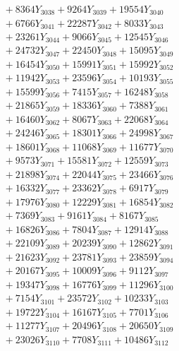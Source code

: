 \documentclass[a4paper,10pt]{article}
\begin{document}
{\begin{align}
&\;  + 8364 Y_{3038} + 9264 Y_{3039} + 19554 Y_{3040} \\[0.3ex]
&\;  + 6766 Y_{3041} + 22287 Y_{3042} + 8033 Y_{3043} \\[0.3ex]
&\;  + 23261 Y_{3044} + 9066 Y_{3045} + 12545 Y_{3046} \\[0.3ex]
&\;  + 24732 Y_{3047} + 22450 Y_{3048} + 15095 Y_{3049} \\[0.3ex]
&\;  + 16454 Y_{3050} + 15991 Y_{3051} + 15992 Y_{3052} \\[0.3ex]
&\;  + 11942 Y_{3053} + 23596 Y_{3054} + 10193 Y_{3055} \\[0.3ex]
&\;  + 15599 Y_{3056} + 7415 Y_{3057} + 16248 Y_{3058} \\[0.5ex]\allowbreak
&\;  + 21865 Y_{3059} + 18336 Y_{3060} + 7388 Y_{3061} \\[0.3ex]
&\;  + 16460 Y_{3062} + 8067 Y_{3063} + 22068 Y_{3064} \\[0.3ex]
&\;  + 24246 Y_{3065} + 18301 Y_{3066} + 24998 Y_{3067} \\[0.3ex]
&\;  + 18601 Y_{3068} + 11068 Y_{3069} + 11677 Y_{3070} \\[0.3ex]
&\;  + 9573 Y_{3071} + 15581 Y_{3072} + 12559 Y_{3073} \\[0.3ex]
&\;  + 21898 Y_{3074} + 22044 Y_{3075} + 23466 Y_{3076} \\[0.3ex]
&\;  + 16332 Y_{3077} + 23362 Y_{3078} + 6917 Y_{3079} \\[0.3ex]
&\;  + 17976 Y_{3080} + 12229 Y_{3081} + 16854 Y_{3082} \\[0.3ex]
&\;  + 7369 Y_{3083} + 9161 Y_{3084} + 8167 Y_{3085} \\[0.3ex]
&\;  + 16826 Y_{3086} + 7804 Y_{3087} + 12914 Y_{3088} \\[0.5ex]\allowbreak
&\;  + 22109 Y_{3089} + 20239 Y_{3090} + 12862 Y_{3091} \\[0.3ex]
&\;  + 21623 Y_{3092} + 23781 Y_{3093} + 23859 Y_{3094} \\[0.3ex]
&\;  + 20167 Y_{3095} + 10009 Y_{3096} + 9112 Y_{3097} \\[0.3ex]
&\;  + 19347 Y_{3098} + 16776 Y_{3099} + 11296 Y_{3100} \\[0.3ex]
&\;  + 7154 Y_{3101} + 23572 Y_{3102} + 10233 Y_{3103} \\[0.3ex]
&\;  + 19722 Y_{3104} + 16167 Y_{3105} + 7701 Y_{3106} \\[0.3ex]
&\;  + 11277 Y_{3107} + 20496 Y_{3108} + 20650 Y_{3109} \\[0.3ex]
&\;  + 23026 Y_{3110} + 7708 Y_{3111} + 10486 Y_{3112} \\[0.3ex]

\end{align}}
\end{document}
